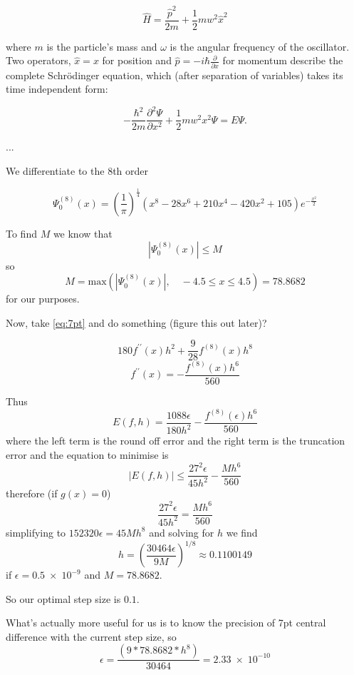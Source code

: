 \begin{equation}
\widehat{H} = \frac{\widehat{p}^2}{2m}+\frac{1}{2}mw^2\widehat{x}^2
\end{equation}

where $m$ is the particle's mass and $ω$ is the angular frequency of the oscillator. Two operators, $\widehat{x} = x$ for position and $\widehat{p} = -i\hbar \frac{\partial}{\partial x}$ for momentum describe the complete Schr\"{o}dinger equation, which (after separation of variables) takes its time independent form:
 
\begin{equation}
-\frac{\hbar^2}{2m}\frac{\partial^2 \Psi}{\partial x^2}+\frac{1}{2}mw^2x^2 \Psi = E\Psi.
\end{equation}

...

We differentiate to the 8th order

\begin{equation}
\Psi_0^{(8)}(x) = \left(\frac{1}{\pi}\right)^{\frac{1}{4}}\left(x^8-28x^6+210x^4-420x^2+105\right)e^{-\frac{x^2}{2}}
\label{eq:7pt}
\end{equation}

To find $M$ we know that
\begin{equation}
 \left|\Psi_0^{(8)}(x)\right| \leq M
\end{equation}
so
\begin{equation}
M = \mathrm{max}\left(\left|\Psi_0^{(8)}(x)\right|, \quad -4.5 \leq x \leq 4.5\right) = 78.8682
\end{equation}
for our purposes.


Now, take \cref{eq:7pt} and do something (figure this out later)?

\begin{equation}
180f^{\prime\prime}(x)h^2+\frac{9}{28}f^{(8)}(x)h^8
\end{equation}
\begin{equation}
  f^{\prime\prime}(x)=-\frac{f^{(8)}(x)h^6}{560}
\end{equation}

Thus
\begin{equation}
  E(f,h) = \frac{1088\epsilon}{180h^2}-\frac{f^{(8)}(\epsilon)h^6}{560}
\end{equation}
where the left term is the round off error and the right term is the truncation error and the equation to minimise is
\begin{equation}
  \left|E(f,h)\right| \leq \frac{27^2\epsilon}{45h^2}-\frac{Mh^6}{560}
\end{equation}
therefore (if $g(x) = 0$)
\begin{equation}
  \frac{27^2\epsilon}{45h^2}=\frac{Mh^6}{560}
\end{equation}
simplifying to $152320\epsilon = 45Mh^8$ and solving for $h$ we find
\begin{equation}
  h = \left(\frac{30464\epsilon}{9M}\right)^{1/8} \approx 0.1100149
\end{equation}
if $\epsilon = 0.5\;\times\;10^{-9}$ and $M = 78.8682$.

So our optimal step size is $0.1$.

What's actually more useful for us is to know the precision of 7pt central difference with the current step size, so
\begin{equation}
\epsilon = \frac{\left(9*78.8682*h^8\right)}{30464} = 2.33\;\times\;10^{-10}
\end{equation}